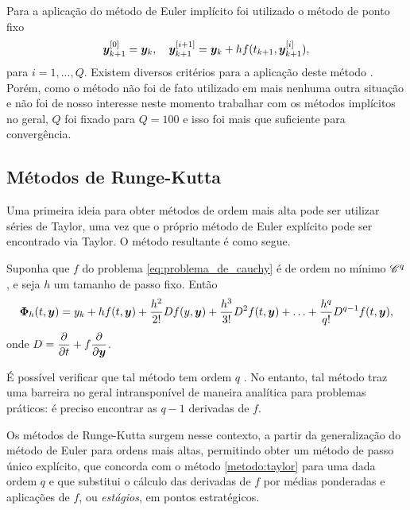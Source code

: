 Para a aplicação do método de Euler implícito foi utilizado o método de ponto fixo
\begin{equation*}
    \bm y_{k+1}^{[0]} = \bm y_k, \quad \bm y_{k+1}^{[i+1]} = \bm y_k + h f(t_{k+1}, \bm y_{k+1}^{[i]}),
\end{equation*}
para $i=1,...,Q$. Existem diversos critérios para a aplicação deste método \citep[325-335]{Hairer2006-oz}. Porém, como o método não foi de fato utilizado em mais nenhuma outra situação e não foi de nosso interesse neste momento trabalhar com os métodos implícitos no geral, $Q$ foi fixado para $Q=100$ e isso foi mais que suficiente para convergência.


\subsection{Métodos de Runge-Kutta}
Uma primeira ideia para obter métodos de ordem mais alta pode ser utilizar séries de Taylor, uma vez que o próprio método de Euler explícito pode ser encontrado via Taylor. O método resultante é como segue.

\begin{method}\label{metodo:taylor}
    Suponha que $f$ do problema \ref{eq:problema_de_cauchy} é de ordem no mínimo ${\mathscr{C}}^q$, e seja $h$ um tamanho de passo fixo. Então
    \begin{equation*}
        \bm \Phi_h(t, \bm y) = y_k + h f(t, \bm y) + \dfrac{h^2}{2!} Df(y,\bm y) + \dfrac{h^3}{3!} D^2 f(t,\bm y) + \hdots + \dfrac{h^q}{q!} D^{q-1} f(t, \bm y),
    \end{equation*}
    onde $D = \dfrac{\partial }{\partial t} + f \dfrac{\partial }{\partial \bm y}$.
\end{method}

É possível verificar que tal método tem ordem $q$ \citep[42]{alexandre_megiorin_roma_metodos_nodate}. No entanto, tal método traz uma barreira no geral intransponível de maneira analítica para problemas práticos: é preciso encontrar as $q-1$ derivadas de $f$.

Os métodos de Runge-Kutta surgem nesse contexto, a partir da generalização do método de Euler para ordens mais altas, permitindo obter um método de passo único explícito, que concorda com o método \ref{metodo:taylor} para uma dada ordem $q$ e que substitui o cálculo das derivadas de $f$ por médias ponderadas e aplicações de $f$, ou \textit{estágios}, em pontos estratégicos.

